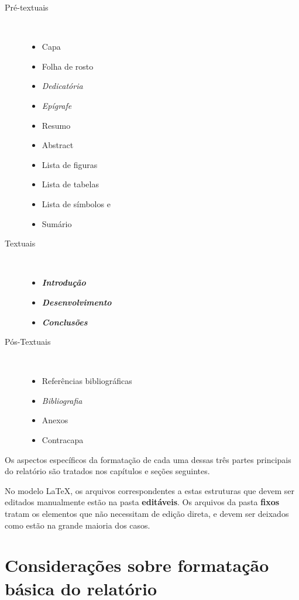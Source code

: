 \begin{description}
	\item [Pré-textuais] \

	\begin{itemize}
		\item Capa
		\item Folha de rosto
		\item \textit{Dedicatória}
		\item \textit{Epígrafe}
		\item Resumo
		\item Abstract
		\item Lista de figuras
		\item Lista de tabelas
		\item Lista de símbolos e
		\item Sumário
	\end{itemize}

	\item [Textuais] \

	\begin{itemize}
		\item \textbf{\textit{Introdução}}
		\item \textbf{\textit{Desenvolvimento}}
		\item \textbf{\textit{Conclusões}}
	\end{itemize}

	\item [Pós-Textuais] \
	
	\begin{itemize}
		\item Referências bibliográficas
		\item \textit{Bibliografia}
		\item Anexos
		\item Contracapa
	\end{itemize}
\end{description}

Os aspectos específicos da formatação de cada uma dessas três partes 
principais do relatório são tratados nos capítulos e seções seguintes.

No modelo \LaTeX, os arquivos correspondentes a estas estruturas que devem
ser editados manualmente estão na pasta \textbf{editáveis}. Os arquivos
da pasta \textbf{fixos} tratam os elementos que não necessitam de 
edição direta, e devem ser deixados como estão na grande maioria dos casos.

\section{Considerações sobre formatação básica do relatório}

